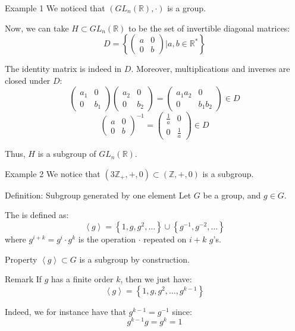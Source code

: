 \documentclass[a4paper]{article}
\begin{document}
\begin{parag}{Example 1}
    We noticed that $\left(GL_{n}\left(\mathbb{R}\right), \cdot \right)$ is a group. 

    Now, we can take $H \subset GL_{n}\left(\mathbb{R}\right)$ to be the set of invertible diagonal matrices: 
    \[D = \left\{\begin{pmatrix} a & 0 \\ 0 & b \end{pmatrix} | a, b \in \mathbb{R}^*\right\}\]
    
    The identity matrix is indeed in $D$. Moreover, multiplications and inverses are closed under $D$: 
    \[\begin{pmatrix} a_1 & 0 \\ 0 & b_1 \end{pmatrix} \begin{pmatrix} a_2 & 0 \\ 0 & b_2 \end{pmatrix} = \begin{pmatrix} a_1 a_2 & 0 \\ 0 & b_1 b_2 \end{pmatrix} \in D\] 
    \[\begin{pmatrix} a & 0 \\ 0 & b \end{pmatrix}^{-1} = \begin{pmatrix} \frac{1}{a} & 0 \\ 0 & \frac{1}{a} \end{pmatrix} \in D\]

    Thus, $H$ is a subgroup of $GL_n\left(\mathbb{R}\right)$.
\end{parag}

\begin{parag}{Example 2}
    We notice that $\left(3 \mathbb{Z}_+, +, 0\right) \subset \left(\mathbb{Z}, +, 0\right)$ is a subgroup.
\end{parag}

\begin{parag}{Definition: Subgroup generated by one element}
    Let $G$ be a group, and $g \in G$.

    The  is defined as: 
    \[\left\langle g \right\rangle = \left\{1, g, g^2, \ldots\right\} \cup \left\{g^{-1}, g^{-2}, \ldots\right\}\]
    where $g^{i+k} = g^i \cdot g^k$ is the operation $\cdot $ repeated on $i+k$ $g$'s.
    
    \begin{subparag}{Property}
        $\left\langle g \right\rangle \subset G$ is a subgroup by construction.
    \end{subparag}

    \begin{subparag}{Remark}
        If $g$ has a finite order $k$, then we just have: 
        \[\left\langle g \right\rangle = \left\{1, g, g^2, \ldots, g^{k-1}\right\}\]
        
        Indeed, we for instance have that $g^{k-1} = g^{-1}$ since: 
        \[g^{k-1} g = g^{k} = 1\]
    \end{subparag}
\end{parag}
\end{document}
